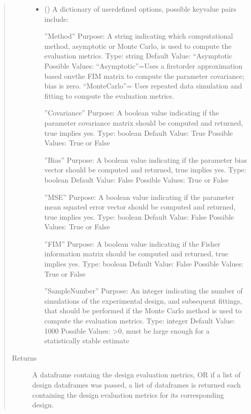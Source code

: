 \documentclass[letterpaper,10pt,english,openany,oneside]{sphinxmanual}
\begin{document}
\begin{fulllineitems}
\begin{fulllineitems}
\begin{quote}
\begin{description}
\begin{itemize}
\item {} 
 (\sphinxstyleliteralemphasis{\sphinxupquote{, }}) \textendash{} 
A dictionary of user\sphinxhyphen{}defined options, possible key\sphinxhyphen{}value
pairs include:

”Method” \textendash{}
Purpose: A string indicating which computational method, asymptotic or Monte Carlo,
is used to compute the evaluation metrics.
Type: string
Default Value: “Asymptotic
Possible Values: “Asymptotic”=Uses a first\sphinxhyphen{}order approximation based onvthe FIM
matrix to compute the parameter covariance; bias is zero. “MonteCarlo”= Uses
repeated data simulation and fitting to compute the evaluation metrics.

”Covariance” \textendash{}
Purpose: A boolean value indicating if the parameter covariance matrix should be
computed and returned, true implies yes.
Type: boolean
Default Value: True
Possible Values: True or False

”Bias” \textendash{}
Purpose: A boolean value indicating if the parameter bias vector should be
computed and returned, true implies yes.
Type: boolean
Default Value: False
Possible Values: True or False

”MSE” \textendash{}
Purpose: A boolean value indicating if the parameter mean squated error vector
should be computed and returned, true implies yes.
Type: boolean
Default Value: False
Possible Values: True or False

”FIM” \textendash{}
Purpose: A boolean value indicating if the Fisher information matrix
should be computed and returned, true implies yes.
Type: boolean
Default Value: False
Possible Values: True or False

”SampleNumber” \textendash{}
Purpose: An integer indicating the number of simulations of the experimental design,
and subsequent fittings, that should be performed if the Monte Carlo method is used
to compute the evaluation metrics.
Type: integer
Default Value: 1000
Possible Values: \textgreater{}0, must be large enough for a statistically stable estimate


\end{itemize}

\item[{Returns}] \leavevmode
A dataframe containg the design evaluation metrics,
OR if a list of design dataframes was passed, a list of dataframes is returned
each containing the design evaluation metrics for its corresponding design.


\end{description}
\end{quote}
\end{fulllineitems}
\end{fulllineitems}
\end{document}
